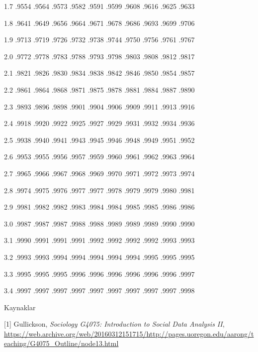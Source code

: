 \documentclass[12pt,fleqn]{article}\usepackage{../../common}
\begin{document}
1.7 .9554 .9564 .9573 .9582 .9591 .9599 .9608 .9616 .9625 .9633

1.8 .9641 .9649 .9656 .9664 .9671 .9678 .9686 .9693 .9699 .9706

1.9 .9713 .9719 .9726 .9732 .9738 .9744 .9750 .9756 .9761 .9767

2.0 .9772 .9778 .9783 .9788 .9793 .9798 .9803 .9808 .9812 .9817

2.1 .9821 .9826 .9830 .9834 .9838 .9842 .9846 .9850 .9854 .9857

2.2 .9861 .9864 .9868 .9871 .9875 .9878 .9881 .9884 .9887 .9890

2.3 .9893 .9896 .9898 .9901 .9904 .9906 .9909 .9911 .9913 .9916

2.4 .9918 .9920 .9922 .9925 .9927 .9929 .9931 .9932 .9934 .9936

2.5 .9938 .9940 .9941 .9943 .9945 .9946 .9948 .9949 .9951 .9952

2.6 .9953 .9955 .9956 .9957 .9959 .9960 .9961 .9962 .9963 .9964

2.7 .9965 .9966 .9967 .9968 .9969 .9970 .9971 .9972 .9973 .9974

2.8 .9974 .9975 .9976 .9977 .9977 .9978 .9979 .9979 .9980 .9981

2.9 .9981 .9982 .9982 .9983 .9984 .9984 .9985 .9985 .9986 .9986

3.0 .9987 .9987 .9987 .9988 .9988 .9989 .9989 .9989 .9990 .9990

3.1 .9990 .9991 .9991 .9991 .9992 .9992 .9992 .9992 .9993 .9993

3.2 .9993 .9993 .9994 .9994 .9994 .9994 .9994 .9995 .9995 .9995

3.3 .9995 .9995 .9995 .9996 .9996 .9996 .9996 .9996 .9996 .9997

3.4 .9997 .9997 .9997 .9997 .9997 .9997 .9997 .9997 .9997 .9998

Kaynaklar

[1] Gullickson, {\em Sociology G4075: Introduction to Social Data Analysis
  II}, \url{https://web.archive.org/web/20160312151715/http://pages.uoregon.edu/aarong/teaching/G4075_Outline/node13.html}
\end{document}
